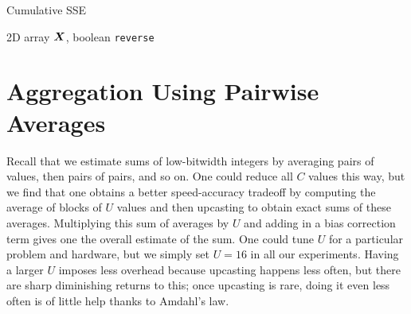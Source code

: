 \begin{algorithm}[h]
\caption{Cumulative SSE} \label{algo:cumSSE}
\begin{algorithmic}[1]
     2D array $\bm{X}$, boolean \texttt{reverse}
    \ENDIF


    \ENDFOR

        \ENDFOR
    \ENDFOR
\end{algorithmic}
\end{algorithm}

\clearpage
\section{Aggregation Using Pairwise Averages} \label{sec:aggregateAnalysis}

Recall that we estimate sums of low-bitwidth integers by averaging pairs of values, then pairs of pairs, and so on. One could reduce all $C$ values this way, but we find that one obtains a better speed-accuracy tradeoff by computing the average of blocks of $U$ values and then upcasting to obtain exact sums of these averages. Multiplying this sum of averages by $U$ and adding in a bias correction term gives one the overall estimate of the sum. One could tune $U$ for a particular problem and hardware, but we simply set $U = 16$ in all our experiments. Having a larger $U$ imposes less overhead because upcasting happens less often, but there are sharp diminishing returns to this; once upcasting is rare, doing it even less often is of little help thanks to Amdahl's law.

